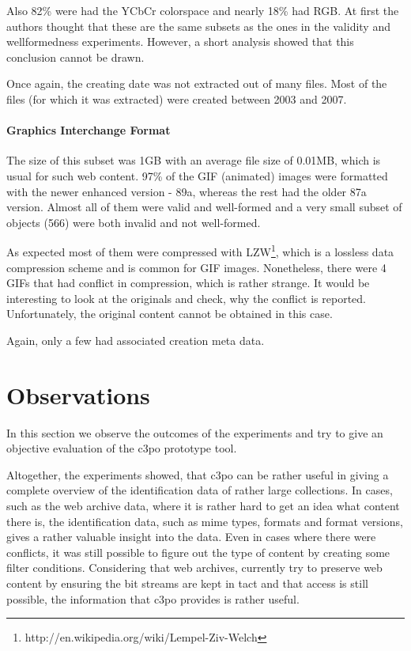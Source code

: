 Also 82\% were had the YCbCr colorspace and nearly 18\% had RGB. At first the authors thought that these are the same subsets as the ones in the validity and wellformedness experiments. However, a short analysis showed that this conclusion cannot be drawn.

Once again, the creating date was not extracted out of many files. Most of the files (for which it was extracted) were created between 2003 and 2007.

\paragraph{Graphics Interchange Format}
The size of this subset was 1GB with an average file size of 0.01MB, which is usual for such web content.
97\% of the GIF (animated) images were formatted with the newer enhanced version - 89a, whereas the rest had the older 87a version. Almost all of them were valid and well-formed and a very small subset of objects (566) were both invalid and not well-formed.

As expected most of them were compressed with LZW\footnote{http://en.wikipedia.org/wiki/Lempel-Ziv-Welch}, which is a lossless data compression scheme and is common for GIF images. Nonetheless, there were 4 GIFs that had conflict in compression, which is rather strange. It would be interesting to look at the originals and check, why the conflict is reported. Unfortunately, the original content cannot be obtained in this case.

Again, only a few had associated creation meta data.

\section{Observations}
In this section we observe the outcomes of the experiments and try to give an objective evaluation of the c3po prototype tool.

Altogether, the experiments showed, that c3po can be rather useful in giving a complete overview of the identification data of rather large collections. In cases, such as the web archive data, where it is rather hard to get an idea what content there is, the identification data, such as mime types, formats and format versions, gives a rather valuable insight into the data. Even in cases where there were conflicts, it was still possible to figure out the type of content by creating some filter conditions. Considering that web archives, currently try to preserve web content by ensuring the bit streams are kept in tact and that access is still possible, the information that c3po provides is rather useful. 


